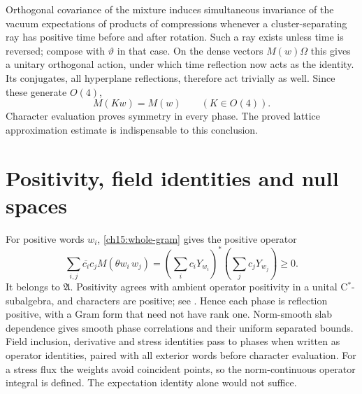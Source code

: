 Orthogonal covariance of the mixture induces simultaneous invariance
of the vacuum expectations of products of compressions whenever a cluster-separating ray has
positive time before and after rotation. Such a ray exists unless
time is reversed; compose with $\vartheta$ in that case. On the dense
vectors $M(w)\Omega$ this gives a unitary orthogonal action, under
which time reflection now acts as the identity. Its conjugates, all
hyperplane reflections, therefore act trivially as well. Since these
generate $O(4)$,
\begin{equation}
                     M(Kw)=M(w)\qquad(K\in O(4)).
 \label{ch15:phase-invariant}
\end{equation}
Character evaluation proves symmetry in every phase. The proved lattice
approximation estimate is indispensable to this conclusion.

\section{Positivity, field identities and null spaces}
\label{ch15:fields}

For positive words $w_i$, \eqref{ch15:whole-gram} gives the positive
operator
\[
 \sum_{i,j}\overline{c_i}c_jM(\theta w_i\,w_j)
                   =\left(\sum_i c_iY_{w_i}\right)^*
                    \left(\sum_j c_jY_{w_j}\right)\ge0.
\]
It belongs to $\mathfrak A$. Positivity agrees with ambient operator
positivity in a unital C$^*$-subalgebra, and characters are positive;
see \cite[Section~2.6]{Landsman1998}. Hence each phase is reflection
positive, with a Gram form that need not have rank one.
Norm-smooth slab dependence gives smooth phase correlations and their
uniform separated bounds. Field inclusion, derivative and stress
identities pass to phases when written as operator identities, paired
with all exterior words before character evaluation. For a stress
flux the weights avoid coincident points, so the norm-continuous operator
integral is defined. The expectation identity alone would not suffice.

